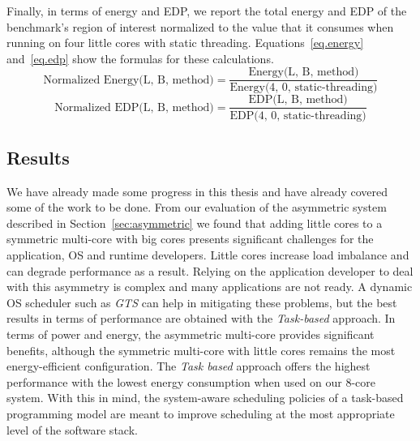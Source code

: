 Finally, in terms of energy and EDP, we report the total energy and EDP of the benchmark's region of interest normalized to the value that it consumes when running on four little cores with static threading.
Equations~\ref{eq.energy} and~\ref{eq.edp} show the formulas for these calculations.
\begingroup\makeatletter\def\f@size{8}\check@mathfonts
\begin{equation}
  \text{Normalized Energy(L, B, method)} = \frac{\text{Energy(L, B, method)}}{\text{Energy(4, 0, static-threading)}}
  \label{eq.energy}
\end{equation}
\begin{equation}
  \text{Normalized EDP(L, B, method)} = \frac{\text{EDP(L, B, method)}}{\text{EDP(4, 0, static-threading)}}
  \label{eq.edp}
\end{equation}
\endgroup

\subsection{Results}
\label{sec:results}

We have already made some progress in this thesis and have already covered some of the work to be done.
From our evaluation of the asymmetric system described in Section~\ref{sec:asymmetric} we found that adding little cores to a symmetric multi-core with big cores presents significant challenges for the application, OS and runtime developers. Little cores increase load imbalance and can degrade performance as a result. Relying on the application developer to deal with this asymmetry is complex and many applications are not ready. A dynamic OS scheduler such as \emph{GTS} can help in mitigating these problems, but the best results in terms of performance are obtained with the \emph{Task-based} approach. In terms of power and energy, the asymmetric multi-core provides significant benefits, although the symmetric multi-core with little cores remains the most energy-efficient configuration. The \emph{Task based} approach offers the highest performance with the lowest energy consumption when used on our 8-core system. With this in mind, the system-aware scheduling policies of a task-based programming model are meant to improve scheduling at the most appropriate level of the software stack.




